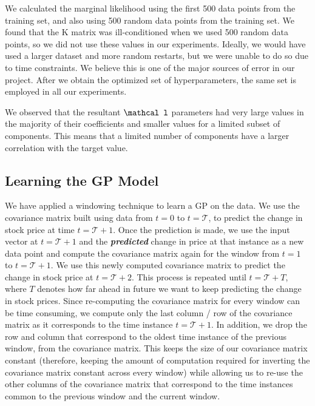 \documentclass{article} %
\def\bfl{\mathbf \mathcal l}
\begin{document}
We calculated the marginal likelihood using the first 500 data points from the training set, and also using 500 random data points from the training set.
We found that the K matrix was ill-conditioned when we used 500 random data points, so we did not use these values in our experiments.
Ideally, we would have used a larger dataset and more random restarts, but we were unable to do so due to time constraints.
We believe this is one of the major sources of error in our project.
After we obtain the optimized set of hyperparameters, the same set is employed in all our experiments.

We observed that the resultant $\bfl$ parameters had very large values in the majority of their coefficients and smaller values for a limited subset of components.
This means that a limited number of components have a larger correlation with the target value.


\subsection{Learning the GP Model}

We have applied a windowing technique to learn a GP on the data. We use the covariance matrix built using data from $t = 0$ to $t = \mathcal{T}$, to predict the change in stock price at time $t = \mathcal{T}+1$. Once the prediction is made, we use the input vector at $t = \mathcal{T}+1$ and the \textbf{\textit{predicted}} change in price at that instance as a new data point and compute the covariance matrix again for the window from $t = 1$ to $t = \mathcal{T}+1$. We use this newly computed covariance matrix to predict the change in stock price at $t=\mathcal{T}+2$. This process is repeated until $t = \mathcal{T}+T$, where $T$ denotes how far ahead in future we want to keep predicting the change in stock prices. Since re-computing the covariance matrix for every window can be time consuming, we compute only the last column / row of the covariance matrix as it corresponds to the time instance $t = \mathcal{T}+1$. In addition, we drop the row and column that correspond to the oldest time instance of the previous window, from the covariance matrix. This keeps the size of our covariance matrix constant (therefore, keeping the amount of computation required for inverting the covariance matrix constant across every window) while allowing us to re-use the other columns of the covariance matrix that correspond to the time instances common to the previous window and the current window.
\end{document}
